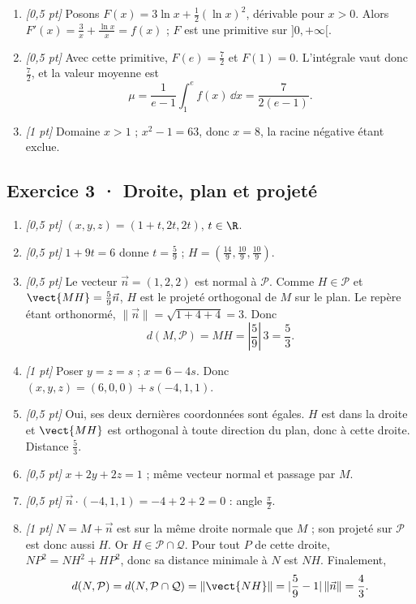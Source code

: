 \begin{enumerate}
\item \textit{[0{,}5 pt]} Posons $F(x)=3\ln x+\frac12(\ln x)^2$, dérivable pour $x>0$. Alors $F'(x)=\frac{3}{x}+\frac{\ln x}{x}=f(x)$ ; $F$ est une primitive sur $]0,+\infty[$.

\item \textit{[0{,}5 pt]} Avec cette primitive, $F(e)=\frac{7}{2}$ et $F(1)=0$. L'intégrale vaut donc $\frac{7}{2}$, et la valeur moyenne est
\[\mu=\frac{1}{e-1}\int_1^e f(x)\,\dd x=\frac{7}{2(e-1)}.\]

\item \textit{[1 pt]} Domaine $x>1$ ; $x^2-1=63$, donc $x=8$, la racine négative étant exclue.

\end{enumerate}

\subsection*{Exercice 3 · Droite, plan et projeté}\begin{enumerate}

\item \textit{[0{,}5 pt]} $(x,y,z)=(1+t,2t,2t)$, $t\in\R$.

\item \textit{[0{,}5 pt]} $1+9t=6$ donne $t=\frac{5}{9}$ ; $H=(\frac{14}{9},\frac{10}{9},\frac{10}{9})$.

\item \textit{[0{,}5 pt]} Le vecteur $\vec n=(1,2,2)$ est normal à $\mathcal P$. Comme $H\in\mathcal P$ et $\vect{MH}=\frac{5}{9}\vec n$, $H$ est le projeté orthogonal de $M$ sur le plan. Le repère étant orthonormé, $\|\vec n\|=\sqrt{1+4+4}=3$. Donc
\[d(M,\mathcal P)=MH=|\frac{5}{9}|\,3=\frac{5}{3}.\]

\item \textit{[1 pt]} Poser $y=z=s$ ; $x=6-4s$. Donc $(x,y,z)=(6,0,0)+s(-4,1,1)$.

\item \textit{[0{,}5 pt]} Oui, ses deux dernières coordonnées sont égales. $H$ est dans la droite et $\vect{MH}$ est orthogonal à toute direction du plan, donc à cette droite. Distance $\frac{5}{3}$.

\item \textit{[0{,}5 pt]} $x+2y+2z=1$ ; même vecteur normal et passage par $M$.

\item \textit{[0{,}5 pt]} $\vec n\cdot(-4,1,1)=-4+2+2=0$ : angle $\frac{\pi}{2}$.

\item \textit{[1 pt]} $N=M+\vec n$ est sur la même droite normale que $M$ ; son projeté sur $\mathcal P$ est donc aussi $H$. Or $H\in\mathcal P\cap\mathcal Q$. Pour tout $P$ de cette droite, $NP^2=NH^2+HP^2$, donc sa distance minimale à $N$ est $NH$. Finalement,
\[d(N,\mathcal P)=d(N,\mathcal P\cap\mathcal Q)=\|\vect{NH}\|=|\frac{5}{9}-1|\,\|\vec n\|=\frac{4}{3}.\]

\end{enumerate}

